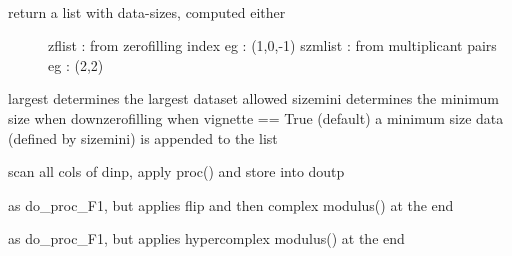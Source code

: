 \documentclass[letterpaper,10pt,openany,oneside]{sphinxmanual}
\begin{document}
\begin{fulllineitems}
\label{rst/code:processing.comp_sizes}~\begin{description}
\item[{return a list with data-sizes, computed either}] \leavevmode
zflist : from zerofilling index    eg : (1,0,-1)
szmlist : from multiplicant pairs  eg : (2,2)

\end{description}

largest determines the largest dataset allowed
sizemini determines the minimum size when downzerofilling
when vignette == True (default) a minimum size data (defined by sizemini) is appended to the list

\end{fulllineitems}


\begin{fulllineitems}
\label{rst/code:processing.do_proc_F1}
scan all cols of dinp, apply proc() and store into doutp

\end{fulllineitems}


\begin{fulllineitems}
\label{rst/code:processing.do_proc_F1_flip_modu}
as do\_proc\_F1, but applies flip and then complex modulus() at the end

\end{fulllineitems}


\begin{fulllineitems}
\label{rst/code:processing.do_proc_F1_modu}
as do\_proc\_F1, but applies hypercomplex modulus() at the end

\end{fulllineitems}
\end{document}

